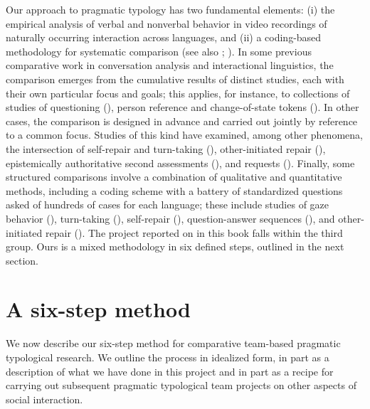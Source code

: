 \documentclass[output=paper,modfonts,nonflat]{langsci/langscibook}
\begin{document}
Our approach to pragmatic typology has two fundamental elements:
(i) the empirical analysis of verbal and nonverbal behavior in video recordings of naturally occurring interaction across languages, and
(ii) a coding-based methodology for systematic comparison (see also \citealt{DingemanseEnfield2015}; \citealt{Rossi2020a}). In some previous comparative work in conversation analysis and interactional linguistics, the comparison emerges from the cumulative results of distinct studies, each with their own particular focus and goals; this applies, for instance, to collections of studies of questioning (\citealt{SteensigDrew2008}), person reference \citep{EnfieldStivers2007} and change-of-state tokens (\citealt{HeinemannKoivisto2016}). In other cases, the comparison is designed in advance and carried out jointly by reference to a common focus. Studies of this kind have examined, among other phenomena, the intersection of self-repair and turn-taking (\citealt{FoxEtAl1996}), other-initiated repair (\citealt{Egbert1996,EgbertEtAl2009}), epistemically authoritative second assessments (\citealt{SidnellEnfield2012}), and requests (\citealt{Zinken2016}). Finally, some structured comparisons involve a combination of qualitative and quantitative methods, including a coding scheme with a battery of standardized questions asked of hundreds of cases for each language; these include studies of gaze behavior (\citealt{RossanoEtAl2009}), turn-taking (\citealt{StiversEtAl2009}), self-repair (\citealt{FoxEtAl2009,FoxEtAl2010}), question-answer sequences (\citealt{EnfieldEtAl2010}), and other-initiated repair (\citealt{DingemanseEtAl2015}). The project reported on in this book falls within the third group. Ours is a mixed methodology in six defined steps, outlined in the next section.

\section{A six-step method}\label{sec:intro:6}

We now describe our six-step method for comparative team-based pragmatic typological research. We outline the process in idealized form, in part as a description of what we have done in this project and in part as a recipe for carrying out subsequent pragmatic typological team projects on other aspects of social interaction.
\end{document}
